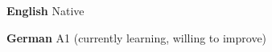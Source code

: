 \begin{minipage}[t]{\textwidth}
\begin{cvskills}[l]

  \cvskill
    {\textbf{English}} %
    {Native} %


  \cvskill
    {\textbf{German}} %
    {A1 (currently learning, willing to improve)} %
 
\end{cvskills}
\end{minipage}

%